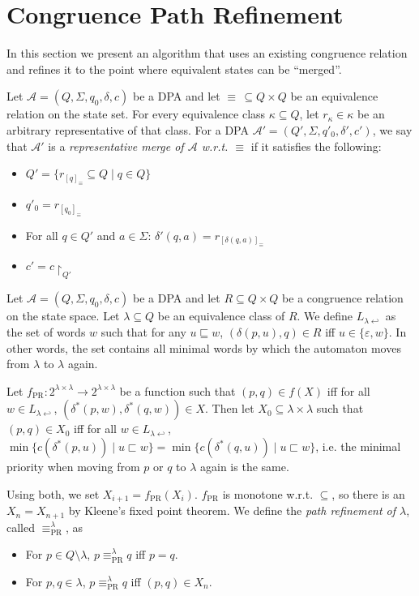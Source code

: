 
\section{Congruence Path Refinement}

In this section we present an algorithm that uses an existing congruence relation and refines it to the point where equivalent states can be \enquote{merged}.

\begin{defn}
	Let $\mathcal{A} = (Q, \Sigma, q_0, \delta, c)$ be a DPA and let $\equiv \,\subseteq Q \times Q$ be an equivalence relation on the state set. For every equivalence class $\kappa \subseteq Q$, let $r_\kappa \in \kappa$ be an arbitrary representative of that class. For a DPA $\mathcal{A}' = (Q', \Sigma, q'_0, \delta', c')$, we say that $\mathcal{A}'$ is a \emph{representative merge of $\mathcal{A}$ w.r.t. $\equiv$} if it satisfies the following:
	\begin{itemize}
		\item $Q' = \{ r_{[q]_\equiv} \subseteq Q \mid q \in Q \}$
		\item $q'_0 = r_{[q_0]_\equiv}$
		\item For all $q \in Q'$ and $a \in \Sigma$: $\delta'(q, a) = r_{[\delta(q, a)]_\equiv}$
		\item $c' = c\upharpoonright_{Q'}$
	\end{itemize}
\end{defn}

\begin{defn}
	Let $\mathcal{A} = (Q, \Sigma, q_0, \delta, c)$ be a DPA and let $R \subseteq Q \times Q$ be a congruence relation on the state space. Let $\lambda \subseteq Q$ be an equivalence class of $R$. We define $L_{\lambda \hookleftarrow}$ as the set of words $w$ such that for any $u \sqsubseteq w$, $(\delta(p, u), q) \in R$ iff $u \in \{\varepsilon, w\}$. In other words, the set contains all minimal words by which the automaton moves from $\lambda$ to $\lambda$ again.
	
	Let $f_\text{PR} : 2^{\lambda \times \lambda} \rightarrow 2^{\lambda \times \lambda}$ be a function such that $(p, q) \in f(X)$  iff for all $w \in L_{\lambda \hookleftarrow}$, $(\delta^*(p, w), \delta^*(q, w)) \in X$.
	Then let $X_0 \subseteq \lambda \times \lambda$ such that $(p, q) \in X_0$ iff for all $w \in L_{\lambda \hookleftarrow}$, $\min \{ c(\delta^*(p, u)) \mid u \sqsubset w \} = \min \{ c(\delta^*(q, u)) \mid u \sqsubset w \}$, i.e. the minimal priority when moving from $p$ or $q$ to $\lambda$ again is the same.
	
	Using both, we set $X_{i+1} = f_\text{PR}(X_i)$. $f_\text{PR}$ is monotone w.r.t. $\subseteq$, so there is an $X_n = X_{n+1}$ by Kleene's fixed point theorem. We define the \emph{path refinement of $\lambda$}, called $\equiv_\text{PR}^\lambda$, as
	\begin{itemize}
		\item For $p \in Q \setminus \lambda$, $p \equiv_\text{PR}^\lambda q$ iff $p = q$.
		\item For $p, q \in \lambda$, $p \equiv_\text{PR}^\lambda q$ iff $(p, q) \in X_n$.
	\end{itemize}
\end{defn}


